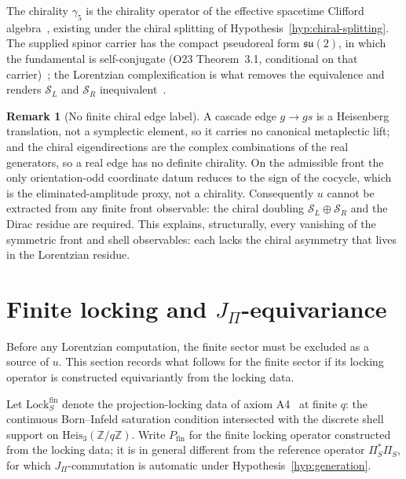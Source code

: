 \documentclass[11pt]{article}
\theoremstyle{definition}
\newtheorem{remark}{Remark}
\newcommand{\Heis}{\mathrm{Heis}}
\newcommand{\PiS}{\Pi_S}
\begin{document}
    The chirality $\gamma_5$ is the chirality operator of the effective spacetime Clifford
    algebra~\cite{Beau2026q14}, existing under the chiral splitting of Hypothesis~\ref{hyp:chiral-splitting}.
    The supplied spinor carrier has the compact pseudoreal form $\mathfrak{su}(2)$, in which the
    fundamental is self-conjugate (O23 Theorem~3.1, conditional on that
    carrier)~\cite{Beau2026a27}; the Lorentzian complexification is what removes the
    equivalence and renders $\mathcal S_L$ and $\mathcal S_R$ inequivalent~\cite{Beau2026q14}.

    \begin{remark}[No finite chiral edge label]
      \label{rem:nogo}
      A cascade edge $g\to gs$ is a Heisenberg translation, not a symplectic element, so it carries no
      canonical metaplectic lift; and the chiral eigendirections are the complex combinations of the real
      generators, so a real edge has no definite chirality.
      On the admissible front the only orientation-odd coordinate datum reduces to the sign of the
      cocycle, which is the eliminated-amplitude proxy, not a chirality.
      Consequently $u$ cannot be extracted from any finite front observable: the chiral doubling
      $\mathcal S_L\oplus\mathcal S_R$ and the Dirac residue are required.
      This explains, structurally, every vanishing of the symmetric front and shell observables: each
      lacks the chiral asymmetry that lives in the Lorentzian residue.
    \end{remark}

  \section{Finite locking and \texorpdfstring{$J_\Pi$}{JΠ}-equivariance}
    \label{sec:finite-equivariance}

    Before any Lorentzian computation, the finite sector must be excluded as a source of $u$.
    This section records what follows for the finite sector if its locking operator is constructed equivariantly from
      the
    locking data.

    Let $\mathrm{Lock}^{\mathrm{fin}}_S$ denote the projection-locking data of axiom A4~\cite{Beau2026m} at
    finite $q$: the continuous Born--Infeld saturation condition intersected with the discrete shell
    support on $\Heis_3(\mathbb{Z}/q\mathbb{Z})$.
    Write $P_{\mathrm{fin}}$ for the finite locking operator constructed from the locking data; it is in general
      different
    from the reference operator $\PiS^{*}\PiS$, for which $J_\Pi$-commutation is automatic under
      Hypothesis~\ref{hyp:generation}.
\end{document}

